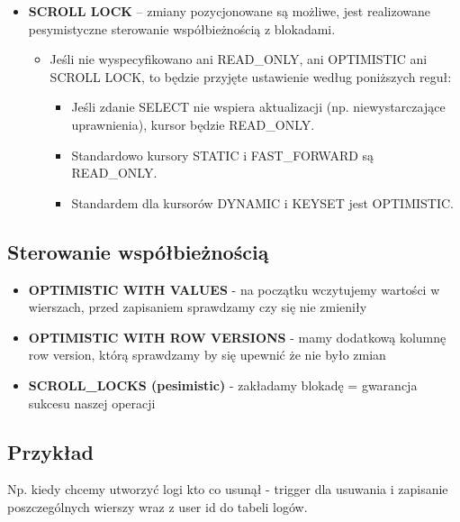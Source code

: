 \documentclass[a4paper]{article}
\begin{document}
\begin{itemize}[noitemsep]
        \item \textbf{SCROLL LOCK} – zmiany pozycjonowane są możliwe, jest realizowane pesymistyczne sterowanie
        współbieżnością z blokadami.
        \begin{itemize}[noitemsep]
            \item Jeśli nie wyspecyfikowano ani READ\_ONLY, ani OPTIMISTIC ani SCROLL LOCK, to będzie przyjęte
            ustawienie według poniższych reguł:
            \begin{itemize}[noitemsep]
                \item Jeśli zdanie SELECT nie wspiera aktualizacji (np. niewystarczające uprawnienia), kursor
                będzie READ\_ONLY.
                \item Standardowo kursory STATIC i FAST\_FORWARD są READ\_ONLY.
                \item Standardem dla kursorów DYNAMIC i KEYSET jest OPTIMISTIC.
            \end{itemize}
        \end{itemize}
    \end{itemize}

    \subsection{Sterowanie współbieżnością}
    \begin{itemize}[noitemsep]
        \item \textbf{OPTIMISTIC WITH VALUES} - na początku wczytujemy wartości w wierszach, przed zapisaniem
        sprawdzamy czy się nie zmieniły
        \item \textbf{OPTIMISTIC WITH ROW VERSIONS} - mamy dodatkową kolumnę row version, którą sprawdzamy by się
        upewnić że nie było zmian
        \item \textbf{SCROLL\_LOCKS (pesimistic)} - zakładamy blokadę = gwarancja sukcesu naszej operacji
    \end{itemize}

    \subsection{Przykład}
    Np. kiedy chcemy utworzyć logi kto co usunął - trigger dla usuwania i zapisanie poszczególnych wierszy wraz z user
    id do tabeli logów.
\end{document}

